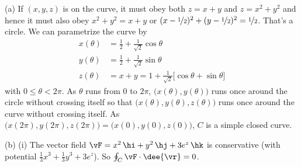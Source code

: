 \begin{solution} (a)
If $(x,y,z)$ is on the curve, it must obey both $z=x+y$
and $z=x^2+y^2$ and hence it must also obey $x^2+y^2=x+y$
or $(x-\nicefrac{1}{2})^2 + (y-\nicefrac{1}{2})^2 = \nicefrac{1}{2}$.
That's a circle. We can parametrize the curve by
\begin{align*}
x(\theta)&= \frac{1}{2} +\frac{1}{\sqrt{2}}\cos\theta \\
y(\theta)&= \frac{1}{2} +\frac{1}{\sqrt{2}}\sin\theta \\
z(\theta)&= x+y = 1+ \frac{1}{\sqrt{2}}\big[\cos\theta+\sin\theta\big]
\end{align*}
with $0\le\theta<2\pi$. As $\theta$ runs from $0$ to $2\pi$,
$\big(x(\theta),y(\theta)\big)$ runs once around the circle without
crossing itself so that  $\big(x(\theta),y(\theta),z(\theta)\big)$ runs
once around the curve without crossing itself. As
$\big(x(2\pi),y(2\pi),z(2\pi)\big)=\big(x(0),y(0),z(0)\big)$,
$C$ is a simple closed curve.

\noindent (b) (i) The vector field $\vF= x^2\,\hi + y^2\,\hj + 3 e^z\,\hk$
is conservative (with potential $\frac{1}{3}x^3 +\frac{1}{3}y^3 + 3e^z$).
So $\oint_C\vF\cdot\dee{\vr}=0$.



\end{solution}
